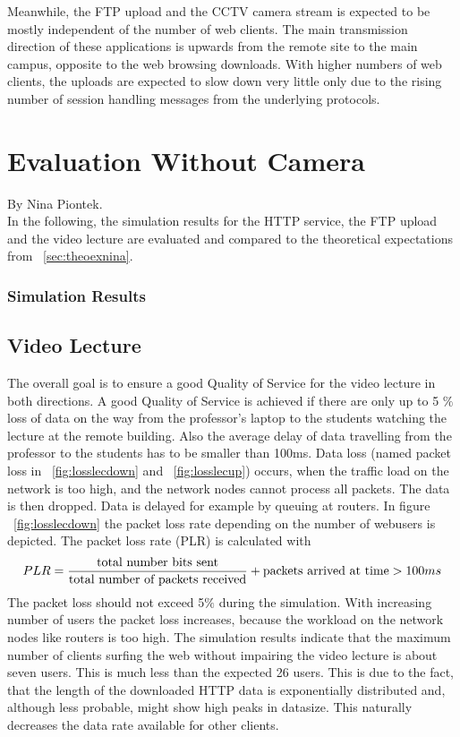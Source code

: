\documentclass[a4paper,10pt]{book}\usepackage{graphicx}
\begin{document}
Meanwhile, the FTP upload and the CCTV camera stream is expected to be mostly independent of the number of web clients. The main transmission direction of these applications is upwards from the remote site to the main campus, opposite to the web browsing downloads. With higher numbers of web clients, the uploads are expected to slow down very little only due to the rising number of session handling messages from the underlying protocols.

\chapter{Evaluation Without Camera}
By Nina Piontek.\\
In the following, the simulation results for the HTTP service, the FTP upload and the video lecture are evaluated and compared to the theoretical expectations from ~\ref{sec:theoexnina}.
\subsection{Simulation Results}
\section{Video Lecture}
The overall goal is to ensure a good Quality of Service for the video lecture in both directions.
A good Quality of Service is achieved if there are only up to 5 $\%$ loss of data
on the way from the professor's laptop to the students watching the lecture at the remote building. Also the average delay of data travelling from the professor to the students has to be smaller than 100ms.
Data loss (named packet loss in ~\ref{fig:losslecdown} and ~\ref{fig:losslecup}) occurs, when the traffic load on the network is too high, and the network nodes cannot process all packets.
The data is then dropped. Data is delayed for example by queuing at routers.
In figure  ~\ref{fig:losslecdown} the packet loss rate depending on the number of
webusers is depicted. The packet loss rate (PLR) is calculated with
\begin{equation}
 PLR=\frac{\textnormal{total number bits sent}}{\textnormal{total number of packets received}} + \textnormal{packets arrived at time} > 100ms
\end{equation}
The packet loss should not exceed 5$\%$ during the simulation.
With increasing number of users the packet loss increases, because the 
workload on the network nodes like routers is too high.
The simulation results indicate that the maximum number of clients surfing the 
web without impairing the video lecture is about seven users. This is much less than the expected 26 users. This is due to the fact, that the 
length of the downloaded HTTP data is exponentially distributed and, although less probable, might show high peaks in datasize. This naturally decreases the data rate available for other clients.
\end{document}
